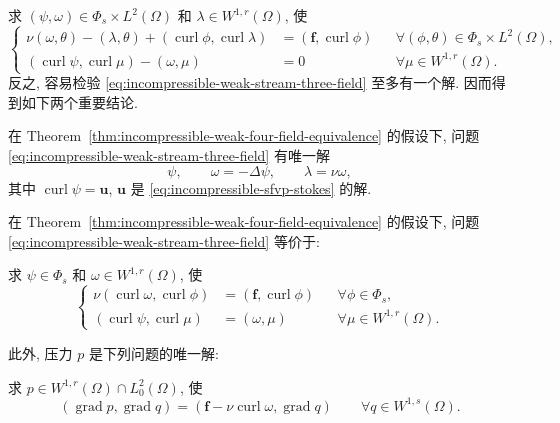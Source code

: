 {求 $(\psi,\omega)\in\Phi_s\times L^2(\Omega)$ 和
$\lambda\in W^{1,r}(\Omega)$, 使
\begin{equation}\label{eq:incompressible-weak-stream-three-field}
\left\{
\begin{aligned}
\nu(\omega,\theta)-(\lambda,\theta)
+(\operatorname{curl}\phi,\operatorname{curl}\lambda)
&=(\mathbf f,\operatorname{curl}\phi)
&&\forall(\phi,\theta)\in\Phi_s\times L^2(\Omega),\\
(\operatorname{curl}\psi,\operatorname{curl}\mu)
-(\omega,\mu)&=0
&&\forall\mu\in W^{1,r}(\Omega).
\end{aligned}
\right.
\end{equation}
反之, 容易检验
\eqref{eq:incompressible-weak-stream-three-field}
至多有一个解. 因而得到如下两个重要结论.

\begin{Corollary}\label{cor:incompressible-weak-stream-unique}
在 Theorem~\ref{thm:incompressible-weak-four-field-equivalence}
的假设下, 问题
\eqref{eq:incompressible-weak-stream-three-field} 有唯一解
\[
\psi,\qquad
\omega=-\Delta\psi,\qquad
\lambda=\nu\omega,
\]
其中
$\operatorname{curl}\psi=\mathbf u$,
$\mathbf u$ 是
\eqref{eq:incompressible-sfvp-stokes} 的解.
\end{Corollary}

\begin{Theorem}\label{thm:incompressible-decoupled-stream-pressure}
在 Theorem~\ref{thm:incompressible-weak-four-field-equivalence}
的假设下, 问题
\eqref{eq:incompressible-weak-stream-three-field}
等价于:

求 $\psi\in\Phi_s$ 和 $\omega\in W^{1,r}(\Omega)$, 使
\begin{equation}\label{eq:incompressible-decoupled-stream-vorticity}
\left\{
\begin{aligned}
\nu(\operatorname{curl}\omega,\operatorname{curl}\phi)
&=(\mathbf f,\operatorname{curl}\phi)
&&\forall\phi\in\Phi_s,\\
(\operatorname{curl}\psi,\operatorname{curl}\mu)
&=(\omega,\mu)
&&\forall\mu\in W^{1,r}(\Omega).
\end{aligned}
\right.
\end{equation}

此外, 压力 $p$ 是下列问题的唯一解:

求 $p\in W^{1,r}(\Omega)\cap L_0^2(\Omega)$, 使
\begin{equation}\label{eq:incompressible-decoupled-pressure}
(\operatorname{grad}p,\operatorname{grad}q)
=(\mathbf f-\nu\operatorname{curl}\omega,
\operatorname{grad}q)
\qquad\forall q\in W^{1,s}(\Omega).
\end{equation}
\end{Theorem}

}
